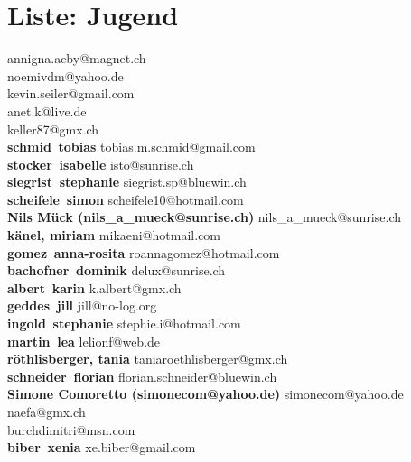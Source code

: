 \documentclass{scrartcl}
\begin{document}
\section*{Liste: Jugend}
\textbf{} annigna.aeby@magnet.ch\\
\textbf{} noemivdm@yahoo.de\\
\textbf{} kevin.seiler@gmail.com\\
\textbf{} anet.k@live.de\\
\textbf{} keller87@gmx.ch\\
\textbf{schmid\, tobias } tobias.m.schmid@gmail.com\\
\textbf{stocker\, isabelle } isto@sunrise.ch\\
\textbf{siegrist\, stephanie } siegrist.sp@bluewin.ch\\
\textbf{scheifele\, simon } scheifele10@hotmail.com\\
\textbf{Nils Mück  (nils_a_mueck@sunrise.ch)\n	 } nils_a_mueck@sunrise.ch\\
\textbf{känel, miriam } mikaeni@hotmail.com\\
\textbf{gomez\, anna-rosita } roannagomez@hotmail.com\\
\textbf{bachofner\, dominik } delux@sunrise.ch\\
\textbf{albert\, karin } k.albert@gmx.ch\\
\textbf{geddes\, jill } jill@no-log.org\\
\textbf{ingold\, stephanie } stephie.i@hotmail.com\\
\textbf{martin\, lea } lelionf@web.de\\
\textbf{röthlisberger, tania } taniaroethlisberger@gmx.ch\\
\textbf{schneider\, florian } florian.schneider@bluewin.ch\\
\textbf{Simone Comoretto (simonecom@yahoo.de) } simonecom@yahoo.de\\
\textbf{} naefa@gmx.ch\\
\textbf{} burchdimitri@msn.com\\
\textbf{biber\, xenia } xe.biber@gmail.com\\
\end{document}
